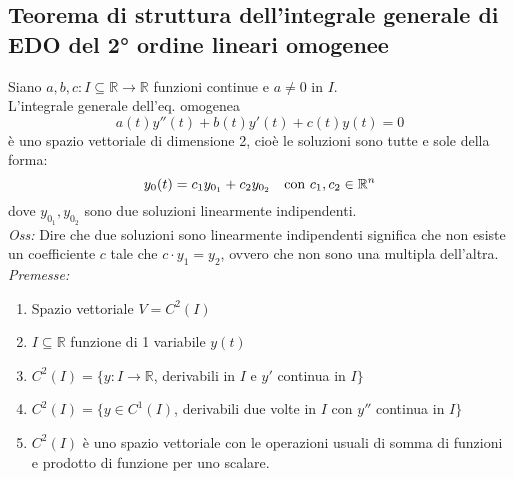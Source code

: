 \documentclass{scrreprt}
\begin{document}
\subsection{Teorema di struttura dell'integrale generale di EDO del 2° ordine lineari omogenee}
Siano $a,b,c : I \subseteq \mathbb{R} \to \mathbb{R}$ funzioni continue e $a \neq 0$ in $I$.\\
L'integrale generale dell'eq. omogenea
\begin{equation}
	a(t)y''(t) + b(t)y'(t) + c(t)y(t) = 0
\end{equation}
è uno spazio vettoriale di dimensione 2, cioè le soluzioni sono tutte e sole della forma:
\begin{equation}
	y_0(t) = c_1y_{0_1}+c_2y_{0_2} \quad \textnormal{con } c_1,c_2 \in \mathbb{R}^n
\end{equation}
dove $y_{0_1},y_{0_2}$ sono due soluzioni linearmente indipendenti.\\


\emph{Oss:} Dire che due soluzioni sono linearmente indipendenti significa che non esiste un coefficiente $c$ tale che $c\cdot y_1 = y_2$, ovvero che non sono una multipla dell'altra.\\
\emph{Premesse:}
\begin{enumerate}
\item Spazio vettoriale $V=C^2(I)$
\item $I\subseteq\mathbb{R}$ funzione di 1 variabile $y(t)$
\item $C^2(I) = \{y:I \to \mathbb{R}$, derivabili in $I$ e $y'$ continua in $I\}$
\item $C^2(I) = \{y \in C^1(I)$, derivabili due volte in $I$ con $y''$ continua in $I\}$
\item $C^2(I)$ è uno spazio vettoriale con le operazioni usuali di somma di funzioni e prodotto di funzione per uno scalare.
\end{enumerate}
\end{document}
